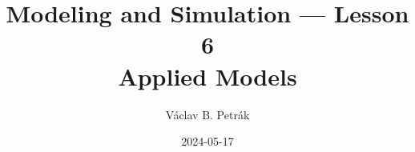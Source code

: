 \documentclass[11pt]{beamer}
\title{
Modeling and Simulation --- Lesson 6\\
\textbf{Applied Models}}
\author{Václav B. Petrák}
\institute{Faculty of Biomedical Engineering\\
Czech Technical University}
\date{2024-05-17}
\begin{document}
\begin{frame}
  \titlepage
\end{frame}
\end{document}
